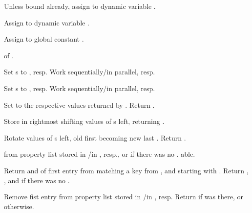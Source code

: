 \begin{LIST}{1cm}

   Unless bound
  already, assign  to dynamic variable .

   Assign
   to dynamic variable .

   Assign
   to global constant .

   of .

  Set s to , resp. Work sequentially/in
  parallel, resp. 

  Set s to , resp. Work sequentially/in
  parallel, resp. 

  Set  to the respective values returned by
  . Return .

   Store  in
  rightmost  shifting values of s left, returning
  .

   Rotate values of s left,
  old first becoming new last . Return \retval{\NIL}.

  \label{:property_lists}
   from property list stored in
  /in , resp., or  if
  there was no . able.

  Return  and  of first entry from 
  matching a key from , and  starting with . Return \retval{\NIL},
  \retvalii{\NIL}, and  \retvaliii{\NIL} if there was no .

  Remove fist entry  from property list stored in
  /in , resp. Return \retval{\T} if 
  was there, or \retval{\NIL} otherwise.

\end{LIST}


